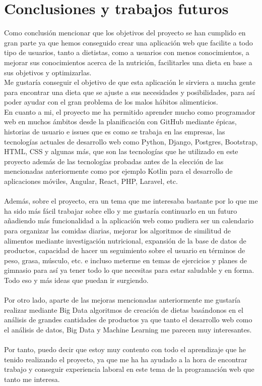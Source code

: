\chapter{Conclusiones y trabajos futuros} \label{sec:conclusion}

Como conclusión mencionar que los objetivos del proyecto se han cumplido en gran parte 
ya que hemos conseguido crear una aplicación web que facilite a todo tipo de usuarios, tanto a dietistas, como a usuarios con menos conocimientos, 
a mejorar sus conocimientos acerca de la nutrición, facilitarles una dieta en base a sus objetivos y optimizarlas.  \\

Me gustaría conseguir el objetivo de que esta aplicación le sirviera a mucha gente para encontrar una dieta que se ajuste
a sus necesidades y posibilidades, para así poder ayudar con el gran problema de los malos hábitos alimenticios.\\

En cuanto a mi, el proyecto me ha permitido aprender mucho como programador web en muchos ámbitos desde
la planificación con GitHub mediante épicas, historias de usuario e issues que es como se 
trabaja en las empresas, las tecnologías actuales de desarrollo web como Python, Django, 
Postgres, Bootstrap, HTML, CSS y algunas más, que son las tecnologías que he utilizado en 
este proyecto además de las tecnologías probadas antes de la elección de las mencionadas 
anteriormente como por ejemplo Kotlin para el desarrollo de aplicaciones móviles, Angular, 
React, PHP, Laravel, etc.
\\\\
Además, sobre el proyecto, era un tema que me interesaba bastante por lo que me ha sido más fácil 
trabajar sobre ello y me gustaría continuarlo en un futuro añadiendo más funcionalidad a 
la aplicación web como pudiera ser un calendario para organizar las comidas diarias, mejorar 
los algoritmos de similitud de alimentos mediante investigación nutricional, expansión de la 
base de datos de productos, capacidad de hacer un seguimiento sobre el usuario en términos de 
peso, grasa, músculo, etc. e incluso meterme en temas de ejercicios y planes de gimnasio para 
así ya tener todo lo que necesitas para estar saludable y en forma. Todo eso y más ideas que puedan ir surgiendo.
\\\\
Por otro lado, aparte de las mejoras mencionadas anteriormente me gustaría realizar mediante
Big Data algoritmos de creación de dietas basándonos en el análisis de grandes cantidades de
productos ya que tanto el desarrollo web como el análisis de datos, Big Data y Machine Learning
me parecen muy interesantes.
\\\\
Por tanto, puedo decir que estoy muy contento con todo el aprendizaje que he tenido realizando 
el proyecto, ya que me ha ha ayudado a la hora de encontrar trabajo y conseguir experiencia laboral en este tema 
de la programación web que tanto me interesa.